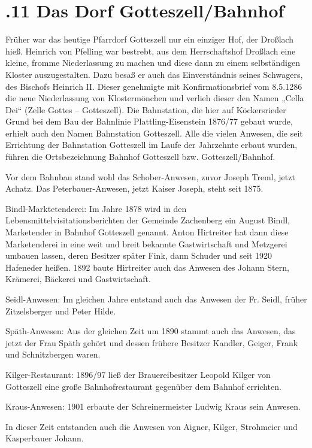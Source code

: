 \documentclass[12pt,a4pager]{book}
\begin{document}
\section{.11 Das Dorf Gotteszell/Bahnhof}

Früher war das heutige Pfarrdorf Gotteszell nur ein einziger Hof, der Droßlach
hieß. Heinrich von Pfelling war bestrebt, aus dem Herrschaftshof Droßlach eine
kleine, fromme Niederlassung zu machen und diese dann zu einem selbständigen
Kloster auszugestalten. Dazu besaß er auch das Einverständnis seines Schwagers,
des Bischofs Heinrich II. Dieser genehmigte mit Konfirmationsbrief vom 8.5.1286
die neue Niederlassung von Klostermönchen und verlieh dieser den Namen „Cella
Dei“ (Zelle Gottes – Gotteszell). Die Bahnstation, die hier auf Köckersrieder
Grund bei dem Bau der Bahnlinie Plattling-Eisenstein 1876/77 gebaut wurde,
erhielt auch den Namen Bahnstation Gotteszell. Alle die vielen Anwesen, die seit
Errichtung der Bahnstation Gotteszell im Laufe der Jahrzehnte erbaut wurden,
führen die Ortsbezeichnung Bahnhof Gotteszell bzw. Gotteszell/Bahnhof.

Vor dem Bahnbau stand wohl das Schober-Anwesen, zuvor Joseph Treml, jetzt
Achatz. Das Peterbauer-Anwesen, jetzt Kaiser Joseph, steht seit 1875.

Bindl-Marktetenderei: Im Jahre 1878 wird in den Lebensmittelvisitationsberichten
der Gemeinde Zachenberg ein August Bindl, Marketender in Bahnhof Gotteszell
genannt. Anton Hirtreiter hat dann diese Marketenderei in eine weit und breit
bekannte Gastwirtschaft und Metzgerei umbauen lassen, deren Besitzer später
Fink, dann Schuder und seit 1920 Hafeneder heißen. 1892 baute Hirtreiter auch
das Anwesen des Johann Stern, Krämerei, Bäckerei und Gastwirtschaft.

Seidl-Anwesen: Im gleichen Jahre entstand auch das Anwesen der Fr. Seidl, früher
Zitzelsberger und Peter Hilde.

Späth-Anwesen: Aus der gleichen Zeit um 1890 stammt auch das Anwesen, das jetzt
der Frau Späth gehört und dessen frühere Besitzer Kandler, Geiger, Frank und
Schnitzbergen waren.

Kilger-Restaurant: 1896/97 ließ der Brauereibesitzer Leopold Kilger von
Gotteszell eine große Bahnhofrestaurant gegenüber dem Bahnhof errichten.

Kraus-Anwesen: 1901 erbaute der Schreinermeister Ludwig Kraus sein Anwesen.

In dieser Zeit entstanden auch die Anwesen von Aigner, Kilger, Strohmeier und
Kasperbauer Johann.
\end{document}
